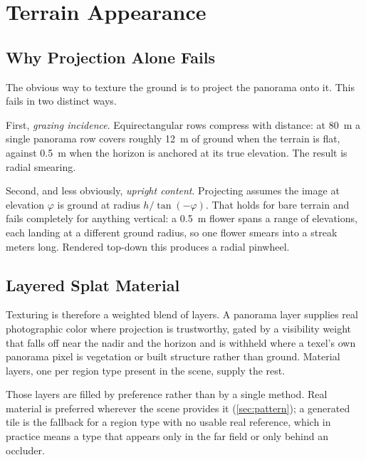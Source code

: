 \section{Terrain Appearance}
\label{sec:texture}

\subsection{Why Projection Alone Fails}

The obvious way to texture the ground is to project the panorama onto it. This
fails in two distinct ways.

First, \emph{grazing incidence}. Equirectangular rows compress with distance: at
\SI{80}{\meter} a single panorama row covers roughly \SI{12}{\meter} of ground
when the terrain is flat, against \SI{0.5}{\meter} when the horizon is anchored at
its true elevation. The result is radial smearing.

Second, and less obviously, \emph{upright content}. Projecting assumes the image
at elevation $\varphi$ is ground at radius $h/\tan(-\varphi)$. That holds for bare
terrain and fails completely for anything vertical: a \SI{0.5}{\meter} flower spans
a range of elevations, each landing at a different ground radius, so one flower
smears into a streak meters long. Rendered top-down this produces a radial
pinwheel.

\subsection{Layered Splat Material}

Texturing is therefore a weighted blend of layers. A panorama layer supplies real
photographic color where projection is trustworthy, gated by a visibility weight
that falls off near the nadir and the horizon and is withheld where a texel's own
panorama pixel is vegetation or built structure rather than ground. Material
layers, one per region type present in the scene, supply the rest.

Those layers are filled by preference rather than by a single method. Real
material is preferred wherever the scene provides it (\cref{sec:pattern}); a
generated tile is the fallback for a region type with no usable real reference,
which in practice means a type that appears only in the far field or only behind
an occluder.

